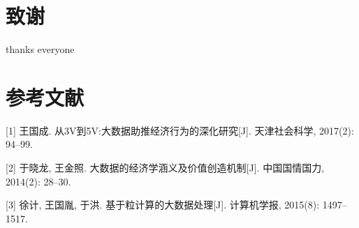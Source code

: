 \documentclass[
]{article}
\begin{document}
\hypertarget{ux81f4ux8c22}{%
\section{致谢}\label{ux81f4ux8c22}}

thanks everyone

\hypertarget{ux53c2ux8003ux6587ux732e}{%
\section{参考文献}\label{ux53c2ux8003ux6587ux732e}}

{[}1{]} 王国成. 从3V到5V:大数据助推经济行为的深化研究{[}J{]}.
天津社会科学, 2017(2): 94--99.

{[}2{]} 于晓龙, 王金照. 大数据的经济学涵义及价值创造机制{[}J{]}.
中国国情国力, 2014(2): 28--30.

{[}3{]} 徐计, 王国胤, 于洪. 基于粒计算的大数据处理{[}J{]}. 计算机学报,
2015(8): 1497--1517.
\end{document}
